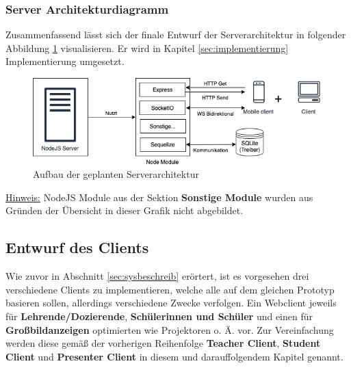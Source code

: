 \subsubsection{Server Architekturdiagramm}\label{sec:serverarchitekt}
Zusammenfassend lässt sich der finale Entwurf der Serverarchitektur in folgender Abbildung \ref{fig:server_diagram} visualisieren. Er wird in Kapitel {\ref{sec:implementierung} Implementierung} umgesetzt.

\begin{figure}[H]
	\centering
	\includegraphics[width=0.8\linewidth]{bilder/server_architektur}
	\caption[Aufbau der geplanten Serverarchitektur]{Aufbau der geplanten Serverarchitektur}
	\label{fig:server_diagram}
\end{figure}
\footnotesize \underline{Hinweis:} NodeJS Module aus der Sektion \textbf{Sonstige Module} wurden aus Gründen der Übersicht in dieser Grafik nicht abgebildet.

\normalsize 
\newpage
\subsection{Entwurf des Clients}\label{sec:clientkonzept}
Wie zuvor in Abschnitt \ref{sec:sysbeschreib} erörtert, ist es vorgesehen drei verschiedene Clients zu implementieren, welche alle auf dem gleichen Prototyp basieren sollen, allerdings verschiedene Zwecke verfolgen. Ein Webclient jeweils für \textbf{Lehrende/Dozierende}, \textbf{Schülerinnen und Schüler} und einen für \textbf{Großbildanzeigen} optimierten wie Projektoren o. Ä. vor. Zur Vereinfachung werden diese gemäß der vorherigen Reihenfolge \textbf{Teacher Client}, \textbf{Student Client} und \textbf{Presenter Client} in diesem und darauffolgendem Kapitel genannt.

